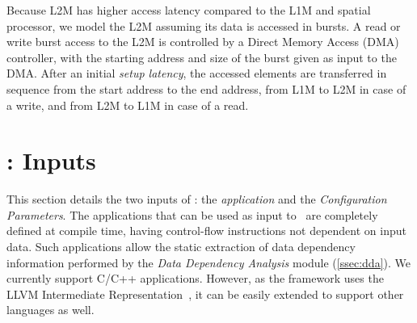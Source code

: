 

\label{ssec:layer2_model}
Because L2M has higher access latency compared to the L1M and spatial processor, we model the L2M assuming its data is accessed in bursts.
A read or write burst access to the L2M is controlled by a Direct Memory Access (DMA) controller, with the starting address and size of the burst given as input to the DMA. After an initial \textit{setup latency}, the accessed elements are transferred in sequence from the start address to the end address, from L1M to L2M in case of a write, and from L2M to L1M in case of a read.

\section{\frameworkname: Inputs}
This section details the two inputs of \frameworkname: the \textit{application} and the \textit{Configuration Parameters}.
\label{ssec:app}
The applications that can be used as input to \frameworkname~are completely defined at compile time, having control-flow instructions not dependent on input data. Such applications allow the static extraction of data dependency information performed by the \textit{Data Dependency Analysis} module (\ref{ssec:dda}). We currently support C/C++ applications. However, as the framework uses the LLVM Intermediate Representation~\cite{llvm}, it can be easily extended to support other languages as well.

